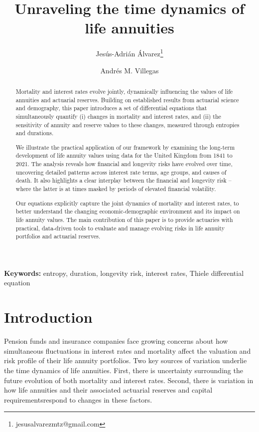 \documentclass[12pt]{article}
\title{Unraveling the time dynamics of life annuities}
\author[1]{Jes\'us-Adri\'an \'Alvarez\thanks{jesusalvarezmtz@gmail.com}}
\author[2]{Andr\'es M. Villegas}
\affil[1]{{\small Independent Researcher} }
\affil[2]{\small{School of Risk and Actuarial Studies\\ UNSW Business School, UNSW Sydney, Australia}}
\begin{document}
\maketitle

{
\setcounter{tocdepth}{2}
}



\begin{abstract}
	
Mortality and interest rates evolve jointly, dynamically influencing the values of life annuities and actuarial reserves. Building on established results from actuarial science and demography, this paper introduces a set of differential equations that simultaneously quantify (i) changes in mortality and interest rates, and (ii) the sensitivity of annuity and reserve values to these changes, measured through entropies and durations.

We illustrate the practical application of our framework by examining the long-term development of life annuity values using data for the United Kingdom from 1841 to 2021. The analysis reveals how financial and longevity risks have evolved over time, uncovering detailed patterns across interest rate terms, age groups, and causes of death. It also highlights a clear interplay between the financial and longevity risk -- where the latter is at times masked by periods of elevated financial volatility.

Our equations explicitly capture the joint dynamics of mortality and interest rates, to better understand the changing economic-demographic environment and its impact on life annuity values. The main contribution of this paper is to provide actuaries with practical, data-driven tools to evaluate and manage evolving risks in life annuity portfolios and actuarial reserves.




	
\end{abstract}

\textbf{Keywords:} entropy, duration, longevity risk, interest rates, Thiele differential equation


\newpage
\section{Introduction}\label{sec:1_introduction}


Pension funds and insurance companies face growing concerns about how simultaneous fluctuations in interest rates and mortality affect the valuation and risk profile of their life annuity portfolios. Two key sources of variation underlie the time dynamics of life annuities. First, there is uncertainty surrounding the future evolution of both mortality and interest rates. Second, there is variation in how life annuities \textemdash and their associated actuarial reserves and capital requirements\textemdash respond to changes in these factors.
\end{document}
